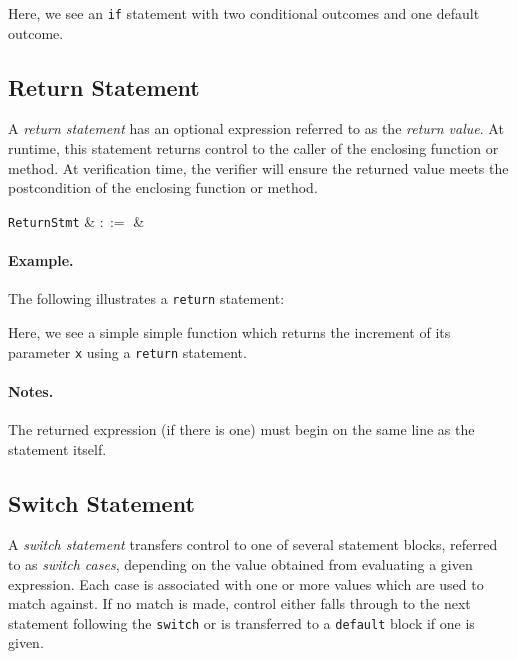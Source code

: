 

Here, we see an \lstinline{if} statement with two conditional outcomes
and one default outcome.


\subsection{Return Statement}
\label{c_stmts_return}
A {\em return statement} has an optional expression referred to as the {\em return value}.  At runtime, this statement returns control to the caller of the enclosing function or method.  At verification time, the verifier will ensure the returned value meets the \gls{postcondition} of the enclosing function or method.

\begin{syntax}
  \verb+ReturnStmt+ & $::=$ & \ \\
\end{syntax}

\paragraph{Example.} The following illustrates a \lstinline{return} statement:



Here, we see a simple simple function which returns the increment of its parameter \lstinline{x} using a \lstinline{return} statement.

\paragraph{Notes.} The returned expression (if there is one) must begin on the same line as the statement itself.


\subsection{Switch Statement}
\label{c_stmts_switch}
A {\em switch statement} transfers control to one of several statement blocks, referred to as {\em switch cases}, depending on the value obtained from evaluating a given expression.  Each case is associated with one or more values which are used to match against.  If no match is made, control either falls through to the next statement following the \lstinline{switch} or is transferred to a \lstinline{default} block if one is given.

